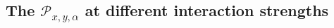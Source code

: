 \documentclass[longbibliography, aps, prx, amsmath, amssymb, amsfonts, twocolumn,superscriptaddress, footinbib]{revtex4-1}
\begin{document}


	
	\subsection{The $\mathcal{P}_{x,y,\alpha}$ at different interaction strengths~\label{sec:AllP}}
\end{document}
